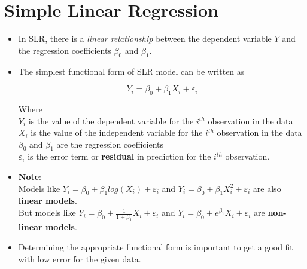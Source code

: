 \documentclass{article}
\theoremstyle{plain}
\theoremstyle{definition}
\begin{document}
\section{Simple Linear Regression}
\begin{itemize}
    \item In SLR, there is a \textit{linear relationship} between the dependent variable $Y$ and the regression coefficients $\beta_0$ and $\beta_1$. 

    \item The simplest functional form of SLR model can be written as
    
    \begin{equation}
        Y_i = \beta_0 + \beta_1 X_i + \varepsilon_i
    \end{equation}
    
    Where\\
    $Y_i$ is the value of the dependent variable for the $i^{th}$ observation in the data\\
    $X_i$ is the value of the independent variable for the $i^{th}$ observation in the data\\
    $\beta_0$ and $\beta_1$ are the regression coefficients\\
    $\varepsilon_i$ is the error term or \textbf{residual} in prediction for the $i^{th}$ observation.
    
    \item \textbf{Note}: \\Models like $Y_i = \beta_0 + \beta_1 log(X_i) + \varepsilon_i$ and $Y_i = \beta_0 + \beta_1 X_i^2+ \varepsilon_i$ are also \textbf{linear models}.\\
    But models like $Y_i = \beta_0 + \frac{1}{1 +\beta_1} X_i + \varepsilon_i$ and $Y_i = \beta_0 + e^{\beta_1} X_i + \varepsilon_i$ are \textbf{non-linear models}. 
    
    \item Determining the appropriate functional form is important to get a good fit with low error for the given data. 
\end{itemize}
\end{document}

